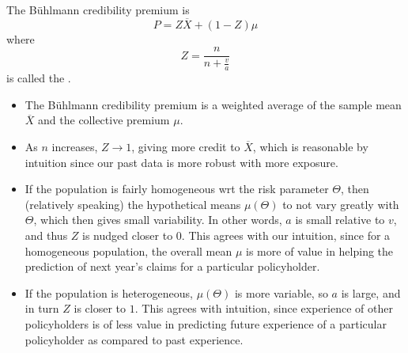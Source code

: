 \documentclass[notoc,notitlepage]{tufte-book}
\begin{document}
\begin{thm}\label{thm:buhlmann_credibility_premium}
  The B\"{u}hlmann credibility premium is
  \begin{equation*}
    P = Z \overline{X} + (1 - Z)\mu
  \end{equation*}
  where
  \begin{equation*}
    Z = \frac{n}{n + \frac{v}{a}}
  \end{equation*}
  is called the .
\end{thm}

\begin{note}
  \begin{itemize}
    \item The B\"{u}hlmann credibility premium is a weighted average of the
      sample mean $\overline{X}$ and the collective premium $\mu$.
    \item As $n$ increases, $Z \to 1$, giving more credit to $\overline{X}$,
      which is reasonable by intuition since our past data is more robust with
      more exposure.
    \item If the population is fairly homogeneous wrt the risk parameter
      $\Theta$, then (relatively speaking) the hypothetical means $\mu(\Theta)$ 
      to not vary greatly with $\Theta$, which then gives small variability. In
      other words, $a$ is small relative to $v$, and thus $Z$ is nudged closer
      to $0$. This agrees with our intuition, since for a homogeneous
      population, the overall mean $\mu$ is more of value in helping the
      prediction of next year's claims for a particular policyholder.
    \item If the population is heterogeneous, $\mu(\Theta)$ is more variable, so
      $a$ is large, and in turn $Z$ is closer to $1$. This agrees with
      intuition, since experience of other policyholders is of less value in
      predicting future experience of a particular policyholder as compared to
      past experience.
  \end{itemize}
\end{note}
\end{document}
